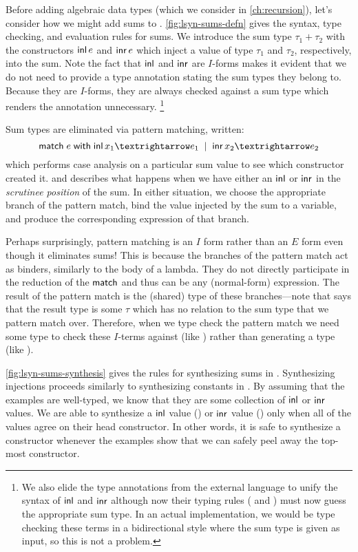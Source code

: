 Before adding algebraic data types (which we consider in \autoref{ch:recursion}), let's consider how we might add sums to \lsyn{}.
\autoref{fig:lsyn-sums-defn} gives the syntax, type checking, and evaluation rules for sums.
We introduce the sum type $τ_1 + τ_2$ with the constructors $\minl{e}$ and $\minr{e}$ which inject a value of type $τ_1$ and $τ_2$, respectively, into the sum.
Note the fact that $\minl{\!}$ and $\minr{\!}$ are $I$-forms makes it evident that we do not need to provide a type annotation stating the sum types they belong to.
Because they are $I$-forms, they are always checked against a sum type which renders the annotation unnecessary.%
\footnote{%
  We also elide the type annotations from the external language to unify the syntax of $\minl{\!}$ and $\minr{\!}$ although now their typing rules ( and ) must now guess the appropriate sum type.
  In an actual implementation, we would be type checking these terms in a bidirectional style where the sum type is given as input, so this is not a problem.
}

Sum types are eliminated via pattern matching, written:
\[
  \mmatch\;e\;\mwith\;\minl{x_1} → e_1 \bnfalt \minr{x_2} → e_2
\]
which performs case analysis on a particular sum value to see which constructor created it.
 and  describes what happens when we have either an $\minl{\!}$ or $\minr{\!}$ in the \emph{scrutinee position} of the sum.
In either situation, we choose the appropriate branch of the pattern match, bind the value injected by the sum to a variable, and produce the corresponding expression of that branch.

Perhaps surprisingly, pattern matching is an $I$ form rather than an $E$ form even though it eliminates sums!
This is because the branches of the pattern match act as binders, similarly to the body of a lambda.
They do not directly participate in the reduction of the $\mathsf{match}$ and thus can be any (normal-form) expression.
The result of the pattern match is the (shared) type of these branches---note that  says that the result type is some $τ$ which has no relation to the sum type that we pattern match over.
Therefore, when we type check the pattern match we need some type to check these $I$-terms against (like ) rather than generating a type (like ).



\autoref{fig:lsyn-sums-synthesis} gives the rules for synthesizing sums in \lsyn{}.
Synthesizing injections proceeds similarly to synthesizing constants in \lsyn{}.
By assuming that the examples are well-typed, we know that they are some collection of $\minl{\!}$ or $\minr{\!}$ values.
We are able to synthesize a $\minl{\!}$ value () or $\minr{\!}$ value () only when all of the values agree on their head constructor.
In other words, it is safe to synthesize a constructor whenever the examples show that we can safely peel away the top-most constructor.

